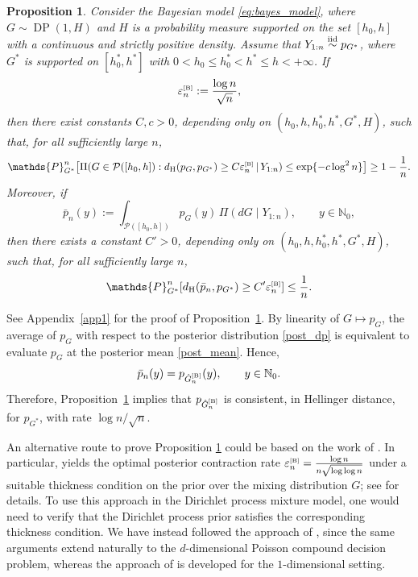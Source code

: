 \documentclass[twoside,12pt]{article}
\def\simiid{\stackrel{\mbox{\scriptsize{iid}}}{\sim}}
\renewcommand{\P}{\mathds{P}}
\newtheorem{prp}[thm]{Proposition}
\begin{document}
\begin{prp}\label{pcrdp_1d}
Consider the Bayesian model \eqref{eq:bayes_model}, where $G\sim \operatorname{DP}(1,H)$ and $H$ is a probability measure supported on the set $[h_{0},h]$ with a continuous and strictly positive density. Assume that $Y_{1:n}\simiid p_{G^\ast}$, where $G^{\ast}$ is supported on $[h_0^\ast,h^\ast]$ with $0<h_0\leq h_0^\ast<h^\ast\leq h<+\infty$. If
\begin{equation}\label{rate_dp}
\varepsilon_n^{\text{\tiny{[B]}}}:=\frac{\log n}{\sqrt n},
\end{equation}
then there exist constants $C,c>0$, depending only on $(h_0,h,h_0^\ast,h^\ast,G^\ast,H)$, such that, for all sufficiently large $n$,
\begin{equation}\label{pcr_dp_1}
\P_{G^\ast}^n\!\left[\Pi\!\left(G\in\mathcal P([h_{0},h]):d_{\mathrm H}(p_G,p_{G^\ast})\ge C\varepsilon_n^{\text{\tiny{[B]}}}\,\middle|\, Y_{1:n}\right)\le\exp\{-c\log^2 n\}\right]\ge1-\frac{1}{n}.
\end{equation}
Moreover, if
\begin{displaymath}
\bar p_n(y):=\int_{\mathcal P([h_{0},h])}p_G(y)\,\Pi(dG\mid Y_{1:n}),\qquad y\in\mathbb N_{0},
\end{displaymath}
then there exists a constant $C'>0$, depending only on $(h_0,h,h_0^\ast,h^\ast,G^\ast,H)$, such that, for all sufficiently large $n$,
\begin{equation}\label{pcr_dp_2}
\P_{G^\ast}^n\!\left[d_{\mathrm H}(\bar p_n,p_{G^\ast})\ge C'\varepsilon_n^{\text{\tiny{[B]}}}\right]\le\frac{1}{n}.
\end{equation}
\end{prp}

See Appendix~\ref{app1} for the proof of Proposition~\ref{pcrdp_1d}. By linearity of $G\mapsto p_G$, the average of $p_{G}$ with respect to the posterior distribution \eqref{post_dp} is equivalent to evaluate $p_{G}$ at the posterior mean \eqref{post_mean}. Hence,
\begin{displaymath}
\bar p_n(y)=p_{\hat G_n^{\text{\tiny{[B]}}}}(y),\qquad y\in\mathbb N_0.
\end{displaymath}
Therefore, Proposition~\ref{pcrdp_1d} implies that $p_{\hat G_n^{\text{\tiny{[B]}}}}$ is consistent, in Hellinger distance, for $p_{G^\ast}$, with rate $\log n/\sqrt n$.


An alternative route to prove Proposition \ref{pcrdp_1d} could be based on the work of \citet{Can(26)}. In particular, \citet[Lemma 2.4]{Can(26)} yields the optimal posterior contraction rate $\varepsilon_n^{\text{\tiny{[B]}}}=\frac{\log n}{n\sqrt{\log\log n}}$ under a suitable thickness condition on the prior over the mixing distribution $G$; see \citet[Defintion 2]{Can(26)} for details. To use this approach in the Dirichlet process mixture model, one would need to verify that the Dirichlet process prior satisfies the corresponding thickness condition. We have instead followed the approach of \citet[Theorem~5.1]{Gho(01)}, since the same arguments extend naturally to the $d$-dimensional Poisson compound decision problem, whereas the approach of \citet{Can(26)} is developed for the $1$-dimensional setting.
 
\end{document}
